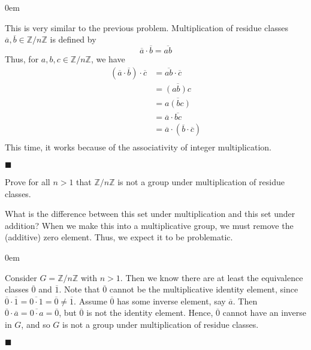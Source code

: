 \documentclass[12pt]{article}
\renewcommand{\qed}{\hfill$\blacksquare$}
\renewenvironment{proof}{\begin{addmargin}[1em]{0em}\begin{newproof}}{\end{newproof}\end{addmargin}\qed}
\newenvironment{problem}[2][Exercise]{\begin{trivlist}
\item[\hskip \labelsep {\bfseries #1}\hskip \labelsep {\bfseries #2.}]}{\end{trivlist}}
\begin{document}
\begin{proof}
This is very similar to the previous problem. Multiplication of residue classes $\overline{a},\overline{b}\in \mathbb{Z}/n\mathbb{Z}$ is defined by
$$ \overline{a}\cdot \overline{b} = \overline{ab} $$
Thus, for $a,b,c\in \mathbb{Z}/n\mathbb{Z}$, we have
\begin{equation*}
    \begin{split}
        \left(\overline{a}\cdot \overline{b}\right)\cdot \overline{c} & = \overline{ab}\cdot \overline{c} \\
        & = \overline{\left(ab\right)c} \\
        & = \overline{a\left(bc\right)} \\
        & = \overline{a}\cdot \overline{bc} \\
        & = \overline{a}\cdot \left(\overline{b}\cdot \overline{c}\right) \\
    \end{split}
\end{equation*}
This time, it works because of the associativity of integer multiplication.
\end{proof}





\begin{problem}{1.1.5}
Prove for all $n>1$ that $\mathbb{Z}/n\mathbb{Z}$ is not a group under multiplication of residue classes.
\end{problem}
{\color{red}What is the difference between this set under multiplication and this set under addition? When we make this into a multiplicative group, we must remove the (additive) zero element. Thus, we expect it to be problematic.} \\
\begin{proof}
Consider $G=\mathbb{Z}/n\mathbb{Z}$ with $n>1$. Then we know there are at least the equivalence classes $\overline{0}$ and $\overline{1}$. Note that $\overline{0}$ cannot be the multiplicative identity element, since $\overline{0}\cdot\overline{1}=\overline{0\cdot 1} = \overline{0}\neq \overline{1}$. Assume $\overline{0}$ has some inverse element, say $\overline{a}$. Then $\overline{0}\cdot\overline{a}=\overline{0\cdot a}=\overline{0}$, but $\overline{0}$ is not the identity element. Hence, $\overline{0}$ cannot have an inverse in $G$, and so $G$ is not a group under multiplication of residue classes.
\end{proof}
\end{document}

